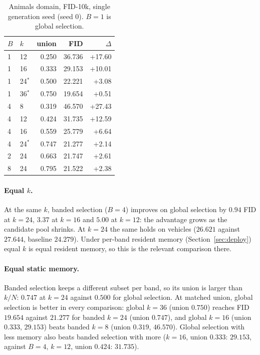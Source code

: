 \begin{table}[t]\centering
\caption{Animals domain, FID-10k, single generation seed (seed 0). $B=1$ is global selection. }\label{tab:main}
\begin{tabular}{llrrr}
\toprule
$B$ & $k$ & union & FID & $\Delta$ \\
\midrule
1 & 12 & 0.250 & 36.736 & +17.60 \\
1 & 16 & 0.333 & 29.153 & +10.01 \\
1 & 24$^*$ & 0.500 & 22.221 & +3.08 \\
1 & 36$^*$ & 0.750 & 19.654 & +0.51 \\
\midrule
4 & 8  & 0.319 & 46.570 & +27.43 \\
4 & 12 & 0.424 & 31.735 & +12.59 \\
4 & 16 & 0.559 & 25.779 & +6.64 \\
4 & 24$^*$ & 0.747 & 21.277 & +2.14 \\
\midrule
2 & 24 & 0.663 & 21.747 & +2.61 \\
8 & 24 & 0.795 & 21.522 & +2.38 \\
\bottomrule
\end{tabular}
\end{table}

\paragraph{Equal $k$.}
At the same $k$, banded selection ($B=4$) improves on global selection by $0.94$ FID at $k=24$, $3.37$ at $k=16$ and $5.00$ at $k=12$: the advantage grows as the candidate pool shrinks. At $k=24$ the same holds on vehicles ($26.621$ against $27.644$, baseline $24.279$). 
Under per-band resident memory (Section~\ref{sec:deploy}) equal $k$ is equal resident memory, so this is the relevant comparison there.

\paragraph{Equal static memory.}
Banded selection keeps a different subset per band, so its union is larger than $k/N$: $0.747$ at $k=24$ against $0.500$ for global selection. At matched union, global selection is better in every comparison: global $k=36$ (union $0.750$) reaches FID $19.654$ against $21.277$ for banded $k=24$ (union $0.747$), and global $k=16$ (union $0.333$, $29.153$) beats banded $k=8$ (union $0.319$, $46.570$). Global selection with less memory also beats banded selection with more ($k=16$, union $0.333$: $29.153$, against $B=4$, $k=12$, union $0.424$: $31.735$).

